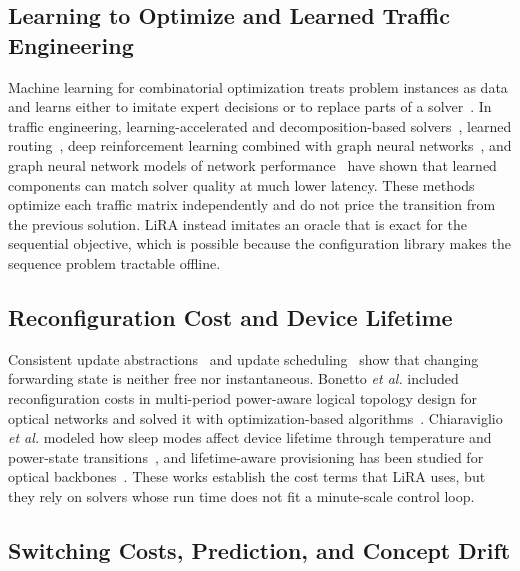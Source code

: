 \documentclass[journal]{IEEEtran}
\begin{document}
\subsection{Learning to Optimize and Learned Traffic Engineering}

Machine learning for combinatorial optimization treats problem instances as data and learns either to imitate expert decisions or to replace parts of a solver~\cite{bengio2021mlco}. In traffic engineering, learning-accelerated and decomposition-based solvers~\cite{xu2023teal,perry2023dote,abuzaid2021ncflow,narayanan2021pop}, learned routing~\cite{valadarsky2017learning}, deep reinforcement learning combined with graph neural networks~\cite{almasan2022enero,bernardez2023magnneto}, and graph neural network models of network performance~\cite{rusek2020routenet} have shown that learned components can match solver quality at much lower latency. These methods optimize each traffic matrix independently and do not price the transition from the previous solution. LiRA instead imitates an oracle that is exact for the sequential objective, which is possible because the configuration library makes the sequence problem tractable offline.

\subsection{Reconfiguration Cost and Device Lifetime}

Consistent update abstractions~\cite{reitblatt2012abstractions} and update scheduling~\cite{jin2014dionysus} show that changing forwarding state is neither free nor instantaneous. Bonetto \emph{et al.} included reconfiguration costs in multi-period power-aware logical topology design for optical networks and solved it with optimization-based algorithms~\cite{bonetto2013multiperiod}. Chiaraviglio \emph{et al.} modeled how sleep modes affect device lifetime through temperature and power-state transitions~\cite{chiaraviglio2015lifetime,chiaraviglio2014impact}, and lifetime-aware provisioning has been studied for optical backbones~\cite{wiatr2016lifetime}. These works establish the cost terms that LiRA uses, but they rely on solvers whose run time does not fit a minute-scale control loop.

\subsection{Switching Costs, Prediction, and Concept Drift}
\end{document}
